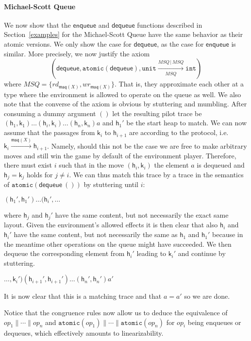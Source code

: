 \documentclass[nocopyrightspace,preprint]{sigplanconf}
\newcommand{\keywd}[1]{\mathtt{#1}}
\newcommand{\myeffto}[3]{\xrightarrow[#2]{#1\,\mid\, #3}}
\newcommand{\inttype}{\keywd{int}}
\newcommand{\unittype}{\keywd{unit}}
\newcommand{\myatomic}[1]{\keywd{atomic}(#1)}
\newcommand{\rEff}[1]{\ensuremath{\mathit{rd}_{#1}}}
\newcommand{\wEff}[1]{\ensuremath{\mathit{wr}_{#1}}}
\newcommand{\locMSQ}{\ensuremath{\mathfrak{msq}}\xspace}
\newcommand{\cloc}{\ensuremath{X}\xspace}
\newcommand\heap{\ensuremath{\mathsf{h}}\xspace}
\newcommand\h{\heap}
\renewcommand\k{\ensuremath{\mathsf{k}}\xspace}
\newcommand\gloc[3]{\ensuremath{#1 \xrightarrow{#3}#2}}
\begin{document}
\paragraph{Michael-Scott Queue}
We now show that the $\mathsf{enqueue}$ and $\mathsf{dequeue}$ functions described in Section~\ref{examples} for the Michael-Scott Queue have the same behavior as their atomic versions. 
We only show the case for $\mathsf{dequeue}$, as the case for $\mathsf{enqueue}$ is similar. More precisely, we now justify the axiom
\[
(\mathsf{dequeue},\myatomic{\mathsf{dequeue}},
\unittype\myeffto{\textit{MSQ}}{\textit{MSQ}}{\textit{MSQ}}\inttype)
\]
\noindent
where $\textit{MSQ}= \{\rEff{\locMSQ(\cloc)},
\wEff{\locMSQ(\cloc)}\}$.  That is, they approximate each other
 at a type where the environment is
allowed to operate on the queue as well. We also note that the
converse of the axiom is obvious by stuttering and mumbling.
After consuming a dummy argument $()$ let the resulting pilot trace be
$(\h_1, \k_1)\ldots(\h_i,\k_i)\ldots(\h_n,\k_n)a$ and $\h_1'$ be the
start heap to match. We can now assume that the passages from $\k_i$
to $\h_{i+1}$ are according to the protocol,
i.e.\ $\gloc{\k_i}{\h_{i+1}}{\locMSQ(\cloc)}$. Namely, should this not
be the case we are free to make arbitrary moves and still win the
game by default of the environment player. Therefore, there must exist
$i$ such that in the move $(\h_i, \k_i)$ the element $a$ is dequeued
and $\h_j=\k_j$ holds for $j\neq i$.  We can thus match this trace by
a trace in the semantics of $\myatomic{\mathsf{dequeue~()}}$ by
stuttering until $i$:

\(
(\h_1', \h_1')\ldots(\h_i',\ldots
\)

\noindent
where $\h_j$ and $\h_j'$ have the same content, but not necessarily the exact same layout. Given the environment's allowed effects it is then clear that also $\h_i$ and $\h_i'$ have the same content, but not necessarily the same as $\h_1$ and $\h_1'$ because in the meantime other operations on the queue might have succeeded. We then dequeue the corresponding element from $\h_i'$ leading to $\k_i'$ and continue by stuttering. 

\(
\ldots,\k_i')(\h_{i+1}',\h_{i+1}')\ldots (\h_n', \h_n')a'
\)

\noindent
It is now clear that this is a matching trace and that $a=a'$ so we are done. 

Notice that the congruence rules now allow us to deduce the equivalence of 
$\textit{op}_1\parallel \cdots \parallel \textit{op}_n$ and 
$\myatomic{\textit{op}_1}\parallel \cdots \parallel \myatomic{\textit{op}_n}$ 
for $\textit{op}_i$ being enqueues or dequeues, which effectively amounts to linearizability. 
\end{document}
